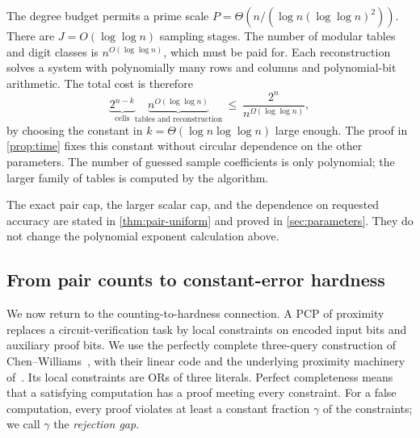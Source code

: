 \documentclass[11pt,letterpaper]{article}
\theoremstyle{definition}
\theoremstyle{remark}
\begin{document}
The degree budget permits a prime scale
\(P=\Theta(n/(\log n(\log\log n)^2))\). There are
\(J=O(\log\log n)\) sampling stages. The number of modular tables
and digit classes is \(n^{O(\log\log n)}\), which must be paid
for. Each reconstruction solves a system with polynomially many
rows and columns and polynomial-bit arithmetic. The total cost is
therefore
\[
 \underbrace{2^{n-k}}_{\text{cells}}
 \underbrace{n^{O(\log\log n)}}_{\text{tables and reconstruction}}
 \ \le\ \frac{2^n}{n^{\Omega(\log\log n)}},
\]
by choosing the constant in \(k=\Theta(\log n\log\log n)\)
large enough. The proof in \cref{prop:time} fixes this constant
without circular dependence on the other parameters.
The number of guessed sample coefficients is only polynomial;
the larger family of tables is computed by the algorithm.

The exact pair cap, the larger scalar cap, and the dependence on
requested accuracy are stated in \cref{thm:pair-uniform} and proved
in \cref{sec:parameters}. They do not change the polynomial
exponent calculation above.

\subsection{From pair counts to constant-error hardness}\label{sec:overview-transfer}

We now return to the counting-to-hardness connection. A PCP of
proximity replaces a circuit-verification task by local constraints
on encoded input bits and auxiliary proof bits. We use the perfectly
complete three-query construction of Chen--Williams~\cite[Lemma~24]{CW19},
with their linear code and the underlying proximity machinery
of~\cite{BGHSV06}. Its local constraints are ORs of three literals.
Perfect completeness means that a satisfying computation has a proof
meeting every constraint. For a false computation, every proof
violates at least a constant fraction \(\gamma\) of the constraints;
we call \(\gamma\) the \emph{rejection gap}.
\end{document}
